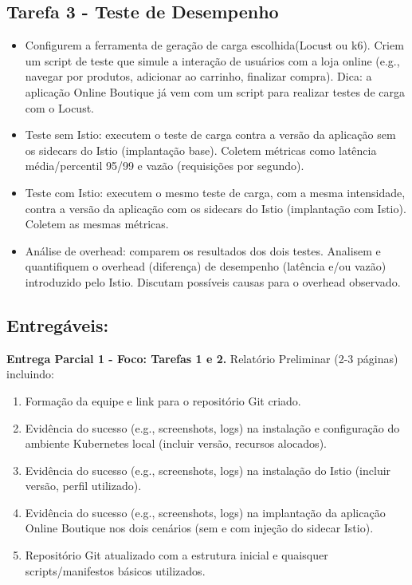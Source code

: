 \documentclass[9pt,a4paper,twocolumn,twoside]{tau-class/tau}
\begin{document}
\subsection{Tarefa 3 - Teste de Desempenho}
\begin{itemize}
    \item Configurem a ferramenta de geração de carga escolhida(Locust ou k6). Criem um script de teste que simule a interação de usuários com a loja online (e.g., navegar por produtos, adicionar ao carrinho, finalizar compra). Dica: a aplicação Online Boutique já vem com um script para realizar testes de carga com o Locust.
    \item Teste sem Istio: executem o teste de carga contra a versão da aplicação sem os sidecars do Istio (implantação base). Coletem métricas como latência média/percentil 95/99 e vazão (requisições por segundo).
    \item Teste com Istio: executem o mesmo teste de carga, com a mesma intensidade, contra a versão da aplicação com os sidecars do Istio (implantação com Istio). Coletem as mesmas métricas.
    \item Análise de overhead: comparem os resultados dos dois testes. Analisem e quantifiquem o overhead (diferença) de desempenho (latência e/ou vazão) introduzido pelo Istio. Discutam possíveis causas para o overhead observado.
\end{itemize}

\subsection{Entregáveis:}
\textbf{Entrega Parcial 1 - Foco: Tarefas 1 e 2.} 
    Relatório Preliminar (2-3 páginas) incluindo:
    \begin{enumerate}
        \item Formação da equipe e link para o repositório Git criado.
        \item Evidência do sucesso (e.g., screenshots, logs) na instalação e configuração do ambiente Kubernetes local (incluir versão, recursos alocados).
        \item Evidência do sucesso (e.g., screenshots, logs) na instalação do Istio (incluir versão, perfil utilizado).
        \item Evidência do sucesso (e.g., screenshots, logs) na implantação da aplicação Online Boutique nos dois cenários (sem e com injeção do sidecar Istio).
        \item Repositório Git atualizado com a estrutura inicial e quaisquer scripts/manifestos básicos utilizados.
    \end{enumerate}
    
\end{document}
